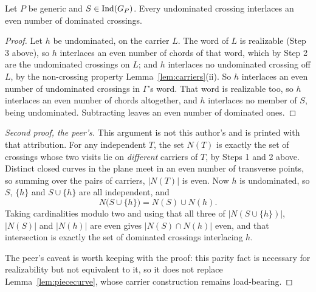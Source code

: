 \begin{corollary}
\label{cor:evendominated}
Let $P$ be generic and $S\in\operatorname{Ind}(G_P)$. Every undominated crossing interlaces an
even number of dominated crossings.
\end{corollary}
\begin{proof}
Let $h$ be undominated, on the carrier $L$. The word of $L$ is realizable
(Step 3 above), so $h$ interlaces an even number of chords of that word, which
by Step 2 are the undominated crossings on $L$; and $h$ interlaces no
undominated crossing off $L$, by the non-crossing property
Lemma~\ref{lem:carriers}(ii). So $h$ interlaces an even number of undominated
crossings in $\Gamma$'s word. That word is realizable too, so $h$ interlaces an
even number of chords altogether, and $h$ interlaces no member of $S$, being
undominated. Subtracting leaves an even number of dominated ones.
\end{proof}
\begin{proof}[Second proof, the peer's]
This argument is not this author's and is printed with that attribution. For any
independent $T$, the set $N(T)$ is exactly the set of crossings whose two visits
lie on \emph{different} carriers of $T$, by Steps 1 and 2 above. Distinct closed
curves in the plane meet in an even number of transverse points, so summing over
the pairs of carriers, $|N(T)|$ is even. Now $h$ is undominated, so $S$,
$\{h\}$ and $S\cup\{h\}$ are all independent, and
\[
   N\bigl(S\cup\{h\}\bigr)=N(S)\cup N(h).
\]
Taking cardinalities modulo two and using that all three of
$|N(S\cup\{h\})|$, $|N(S)|$ and $|N(h)|$ are even gives $|N(S)\cap N(h)|$ even,
and that intersection is exactly the set of dominated crossings interlacing $h$.

The peer's caveat is worth keeping with the proof: this parity fact is necessary
for realizability but not equivalent to it, so it does not replace
Lemma~\ref{lem:piececurve}, whose carrier construction remains load-bearing.
\end{proof}



